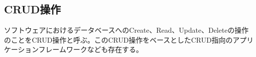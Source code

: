 \documentclass[../../../main]{subfiles}
\begin{document}
    \subsection{CRUD操作}\label{subsec:phraseology-crud}

    ソフトウェアにおけるデータベースへのCreate、Read、Update、Deleteの操作のことをCRUD操作と呼ぶ。このCRUD操作をベースとしたCRUD指向のアプリケーションフレームワークなども存在する。\cite{現場で役立つシステム設計の原則}
\end{document}
